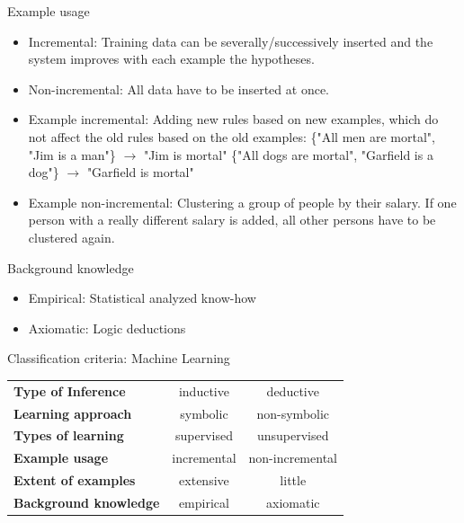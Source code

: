 \documentclass{beamer}
\begin{document}
	\begin{frame}{Example usage}
    	\begin{small}
		\begin{itemize}
			\item Incremental: Training data can be severally/successively inserted and the system improves with each example the hypotheses.
			\item Non-incremental: All data have to be inserted at once.
			\newline
			\item Example incremental: Adding new rules based on new examples, which do not affect the old rules based on the old examples: \newline \{"All men are mortal", "Jim is a man"\} $\rightarrow$ "Jim is mortal" \newline \{"All dogs are mortal", "Garfield is a dog"\} $\rightarrow$ "Garfield is mortal"
			\item Example non-incremental: Clustering a group of people by their salary. If one person with a really different salary is added, all other persons have to be clustered again.
		\end{itemize}
        \end{small}
	\end{frame}

	\begin{frame}{Background knowledge}
		\begin{itemize}
			\item Empirical: Statistical analyzed know-how
			\item Axiomatic: Logic deductions
		\end{itemize}
	\end{frame}
	
	\begin{frame}{Classification criteria: Machine Learning}
		 \begin{tabular}{lcc}
		 	\hline
			\textbf{Type of Inference}	& inductive 	& deductive\\
			\textbf{Learning approach}	& symbolic	 	& non-symbolic\\
			\textbf{Types of learning}	& supervised	& unsupervised\\
			\textbf{Example usage}		& incremental	& non-incremental\\
			\textbf{Extent of examples}	& extensive		& little\\
			\textbf{Background knowledge}& empirical	 	& axiomatic\\
			\hline
		 \end{tabular}
	\end{frame}  
	
\end{document}
